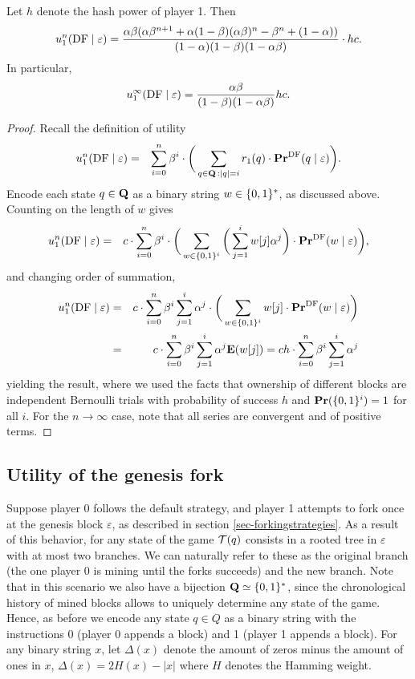 \begin{myprop*}
Let $h$ denote the hash power of player 1. Then 
$$u_1^n(\text{\rm DF}\mid\varepsilon) = \frac{\alpha\beta(\alpha\beta^{n+1}+\alpha(1-\beta)(\alpha\beta)^{n}-\beta^{n}+(1-\alpha))}{(1-\alpha)(1-\beta)(1-\alpha\beta)}\cdot h c.$$
In particular,
$$u_1^\infty(\text{\rm DF}\mid\varepsilon) = \frac{\alpha\beta}{(1-\beta)(1-\alpha\beta)}hc.$$
\end{myprop*}
\begin{proof}
Recall the definition of utility 
\begin{eqnarray*}
u_1^n(\text{\rm DF} \mid \varepsilon) & = & \sum_{i=0}^{n}\beta^{i} \cdot  \bigg(\sum_{\substack{q \in \mathbf{Q} \,: |q| = i}} r_1(q) \cdot 
\mathbf{Pr}^{\text{\rm DF}}(q \mid \varepsilon)\bigg).
\end{eqnarray*}
Encode each state $q\in\mathbf{Q}$ as a binary string $w\in \{0,1\}^\ast$, as discussed above. Counting on the length of $w$ gives
\begin{eqnarray*}
u_1^n(\text{\rm DF} \mid \varepsilon)& = & c\cdot \sum_{i=0}^{n}\beta^{i} \cdot\bigg(\sum_{w\in\{0,1\}^i}  \bigg( \sum_{j=1}^{i}w[j] \alpha^j \bigg)\cdot 
\mathbf{Pr}^{\text{\rm DF}}(w \mid \varepsilon)\bigg),
\end{eqnarray*}
and changing order of summation,
\begin{eqnarray*}
u_1^n(\text{\rm DF} \mid \varepsilon)& = &c\cdot \sum_{i=0}^{n}\beta^{i}\sum_{j=1}^{i} \alpha^j \cdot\bigg(\sum_{w\in\{0,1\}^i}   w[j]\cdot 
\mathbf{Pr}^{\text{\rm DF}}(w \mid \varepsilon)\bigg)\\
							& = & c\cdot \sum_{i=0}^{n}\beta^{i}\sum_{j=1}^{i} \alpha^j \mathbf{E}(w[j]) = ch\cdot \sum_{i=0}^{n}\beta^{i}\sum_{j=1}^{i} \alpha^j 
\end{eqnarray*}
yielding the result, where we used the facts that ownership of different blocks are independent Bernoulli trials with probability of success $h$ and $\mathbf{Pr}(\{0,1\}^i)=1$ for all $i$. For the $n\to\infty$ case, note that all series are convergent and of positive terms.
\end{proof}

\subsection{Utility of the genesis fork}
\label{sec-genfork}
Suppose player 0 follows the default strategy, and player 1 attempts to fork once at the genesis block $\varepsilon$, as described in section \ref{sec-forkingstrategies}. As a result of this behavior, for any state of the game $\mathcal{T}(q)$ consists in a rooted tree in $\varepsilon$ with at most two branches. We can naturally refer to these as the original branch (the one player 0 is mining until the forks succeeds) and the new branch. Note that in this scenario we also have a bijection $\mathbf{Q}\simeq \{0,1\}^\ast$, since the chronological history of mined blocks allows to uniquely determine any state of the game. Hence, as before we encode any state $q\in Q$ as a binary string with the instructions 0 (player 0 appends a block) and 1 (player 1 appends a block). For any binary string $x$, let $\Delta(x)$ denote the amount of zeros minus the amount of ones in $x$, \ie $\Delta(x)=2H(x)-|x|$ where $H$ denotes the Hamming weight.

